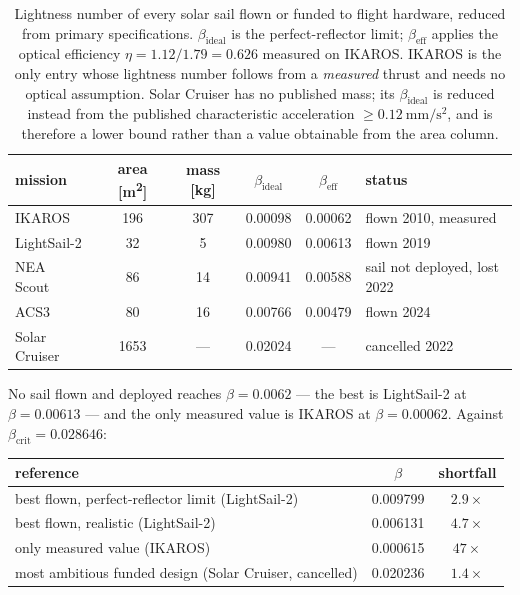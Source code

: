 \documentclass[11pt,a4paper]{article}
\begin{document}
\begin{table}[t]
  \centering
  \caption{Lightness number of every solar sail flown or funded to flight
  hardware, reduced from primary specifications. $\beta_{\mathrm{ideal}}$ is the
  perfect-reflector limit; $\beta_{\mathrm{eff}}$ applies the optical efficiency
  $\eta=1.12/1.79=0.626$ measured on IKAROS. IKAROS is the only entry whose
  lightness number follows from a \emph{measured} thrust and needs no optical
  assumption. Solar Cruiser has no published mass; its $\beta_{\mathrm{ideal}}$
  is reduced instead from the published characteristic acceleration
  $\geq\SI{0.12}{\milli\metre\per\second\squared}$, and is therefore a lower
  bound rather than a value obtainable from the area column.}
  \label{tab:tech}
  \begin{tabular}{lccccl}
    \toprule
    mission & area [\si{\metre\squared}] & mass [\si{\kilogram}] &
    $\beta_{\mathrm{ideal}}$ & $\beta_{\mathrm{eff}}$ & status \\
    \midrule
    IKAROS~\cite{mori2010,tsuda2011}   & 196  & 307 & \num{0.00098} & \num{0.00062} & flown 2010, measured \\
    LightSail-2~\cite{spencer2021}     & 32   & 5   & \num{0.00980} & \num{0.00613} & flown 2019 \\
    NEA Scout~\cite{mcnutt2014}        & 86   & 14  & \num{0.00941} & \num{0.00588} & sail not deployed, lost 2022 \\
    ACS3~\cite{acs3}                   & 80   & 16  & \num{0.00766} & \num{0.00479} & flown 2024 \\
    Solar Cruiser                      & 1653 & --- & \num{0.02024} & ---           & cancelled 2022 \\
    \bottomrule
  \end{tabular}
\end{table}

No sail flown and deployed reaches $\beta=\num{0.0062}$ --- the best is
LightSail-2 at $\beta=\num{0.00613}$ --- and the only measured value is IKAROS
at $\beta=\num{0.00062}$. Against
$\beta_{\mathrm{crit}}=\num{0.028646}$:

\begin{center}
\begin{tabular}{lcc}
  \toprule
  reference & $\beta$ & shortfall \\
  \midrule
  best flown, perfect-reflector limit (LightSail-2) & \num{0.009799} & $2.9\times$ \\
  best flown, realistic (LightSail-2)               & \num{0.006131} & $4.7\times$ \\
  only measured value (IKAROS)                      & \num{0.000615} & $47\times$ \\
  most ambitious funded design (Solar Cruiser, cancelled) & \num{0.020236} & $1.4\times$ \\
  \bottomrule
\end{tabular}
\end{center}
\end{document}
